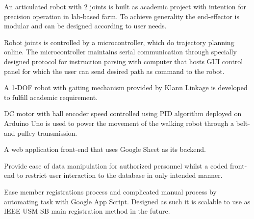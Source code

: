 \documentclass[letterpaper]{deedy-resume} %
\begin{document}
\begin{minipage}[t]{0.66\textwidth}
\vspace{\topsep}
\begin{tightitemize}
\item An articulated robot with 2 joints is built as academic project with intention for precision operation in lab-based farm. To achieve generality the end-effector is modular and can be designed according to user needs.
\item Robot joints is controlled by a microcontroller, which do trajectory planning online. 
The microcontroller maintains serial communication through specially designed protocol for instruction parsing with computer that hosts GUI control panel for which the user can send desired path as command to the robot.
\end{tightitemize} 
\sectionspace %

\vspace{\topsep}
\begin{tightitemize}
\item A 1-DOF robot with gaiting mechanism provided by Klann Linkage is developed to fulfill academic requirement.
\item DC motor with hall encoder speed controlled using PID algorithm deployed on Arduino Uno is used to power the movement of the walking robot through a belt-and-pulley transmission.
\end{tightitemize} 
\sectionspace %

\vspace{\topsep}
\begin{tightitemize}
\item A web application front-end that uses Google Sheet as its backend.
\item Provide ease of data manipulation for authorized personnel whilst a coded front-end to restrict user interaction to the database in only intended manner.
\item Ease member registrations process and complicated manual process by automating task with Google App Script. 
Designed as such it is scalable to use as IEEE USM SB main registration method in the future.
\end{tightitemize} 
\sectionspace %

\end{minipage} %
\end{document}
